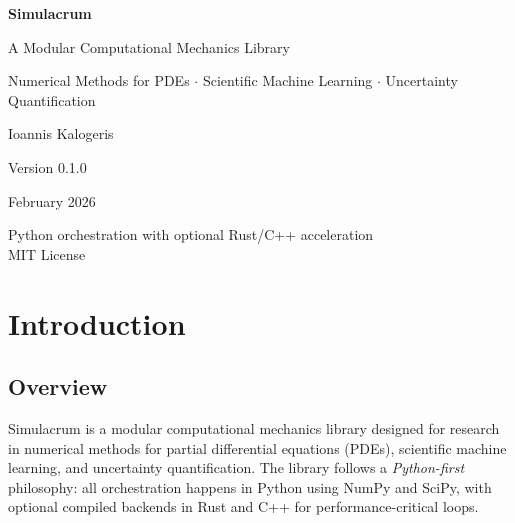 \documentclass[11pt,a4paper]{report}
\begin{document}
\begin{titlepage}
\centering
\vspace*{3cm}

{\Huge\bfseries\textcolor{simblue}{Simulacrum}\par}
\vspace{0.5cm}
{\Large\textcolor{codegray}{A Modular Computational Mechanics Library}\par}

\vspace{2cm}

{\large
Numerical Methods for PDEs $\cdot$ Scientific Machine Learning $\cdot$ Uncertainty Quantification
\par}

\vspace{3cm}

{\large Ioannis Kalogeris\par}
\vspace{0.5cm}
{\normalsize Version 0.1.0\par}
\vspace{0.3cm}
{\normalsize\textcolor{codegray}{February 2026}\par}

\vfill

{\small
Python orchestration with optional Rust/C++ acceleration\\
MIT License
\par}
\end{titlepage}

\tableofcontents
\newpage

\chapter{Introduction}

\section{Overview}

Simulacrum is a modular computational mechanics library designed for research in numerical methods for partial differential equations (PDEs), scientific machine learning, and uncertainty quantification. The library follows a \emph{Python-first} philosophy: all orchestration happens in Python using NumPy and SciPy, with optional compiled backends in Rust and C++ for performance-critical loops.
\end{document}
